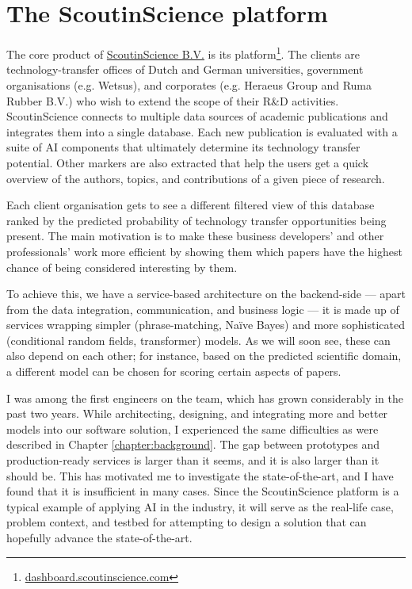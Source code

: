 \chapter{The ScoutinScience platform} \label{chapter:case}

The core product of \href{https://scoutinscience.com/}{ScoutinScience B.V.} is its platform\footnote{\href{https://dashboard.scoutinscience.com/}{dashboard.scoutinscience.com}}. The clients are technology-transfer offices of Dutch and German universities, government organisations (e.g. Wetsus), and corporates (e.g. Heraeus Group and Ruma Rubber B.V.) who wish to extend the scope of their R\&D activities. ScoutinScience connects to multiple data sources of academic publications and integrates them into a single database. Each new publication is evaluated with a suite of AI components that ultimately determine its technology transfer potential. Other markers are also extracted that help the users get a quick overview of the authors, topics, and contributions of a given piece of research.

Each client organisation gets to see a different filtered view of this database ranked by the predicted probability of technology transfer opportunities being present. The main motivation is to make these business developers' and other professionals' work more efficient by showing them which papers have the highest chance of being considered interesting by them. 

To achieve this, we have a service-based architecture \cite{kleppmann2017designing} on the backend-side --- apart from the data integration, communication, and business logic --- it is made up of services wrapping simpler (phrase-matching, Naïve Bayes) and more sophisticated (conditional random fields, transformer) models. As we will soon see, these can also depend on each other; for instance, based on the predicted scientific domain, a different model can be chosen for scoring certain aspects of papers.

I was among the first engineers on the team, which has grown considerably in the past two years. While architecting, designing, and integrating more and better models into our software solution, I experienced the same difficulties as were described in Chapter \ref{chapter:background}. The gap between prototypes and production-ready services is larger than it seems, and it is also larger than it should be. This has motivated me to investigate the state-of-the-art, and I have found that it is insufficient in many cases. Since the ScoutinScience platform is a typical example of applying AI in the industry, it will serve as the real-life case, problem context, and testbed for attempting to design a solution that can hopefully advance the state-of-the-art.

